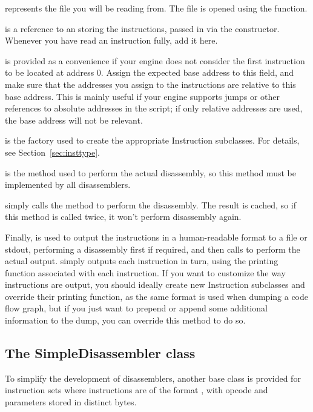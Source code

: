  represents the file you will be reading from. The file is opened using the  function.

 is a reference to an  storing the instructions, passed in via the constructor. Whenever you have read an instruction fully, add it here.

 is provided as a convenience if your engine does not consider the first instruction to be located at address 0. Assign the expected base address to this field, and make sure that the addresses you assign to the instructions are relative to this base address. This is mainly useful if your engine supports jumps or other references to absolute addresses in the script; if only relative addresses are used, the base address will not be relevant.

 is the factory used to create the appropriate Instruction subclasses. For details, see Section~\vref{sec:insttype}.

 is the method used to perform the actual disassembly, so this method must be implemented by all disassemblers.

 simply calls the  method to perform the disassembly. The result is cached, so if this method is called twice, it won't perform disassembly again.

Finally,  is used to output the instructions in a human-readable format to a file or stdout, performing a disassembly first if required, and then calls  to perform the actual output.  simply outputs each instruction in turn, using the printing function associated with each instruction. If you want to customize the way instructions are output, you should ideally create new Instruction subclasses and override their printing function, as the same format is used when dumping a code flow graph, but if you just want to prepend or append some additional information to the dump, you can override this method to do so.

\subsection{The SimpleDisassembler class}
\label{sec:simpledisasm}
To simplify the development of disassemblers, another base class is provided for instruction sets where instructions are of the format , with opcode and parameters stored in distinct bytes.

